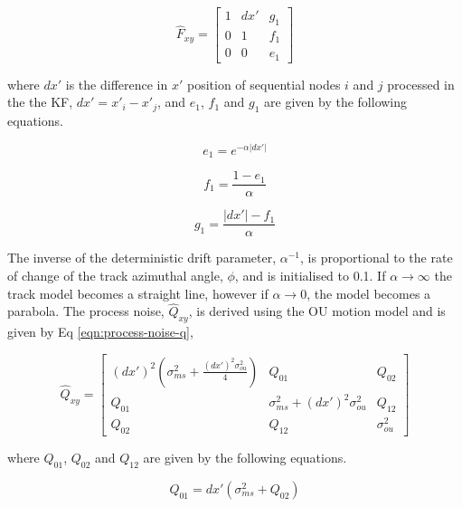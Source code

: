 \begin{equation}
\hat{F}_{xy} = \begin{bmatrix} 1 & dx' & g_1 \\ 0 & 1 & f_1 \\ 0 & 0 & e_1 \end{bmatrix} 
\label{eqn:state-transition-jacobian-ou}
\end{equation}

where $dx'$ is the difference in $x'$ position of sequential nodes $i$ and $j$ processed in the the KF, $dx' = x'_i - x'_j$, and $e_1$, $f_1$ and $g_1$ are given by the following equations. 

\begin{equation}
e_1 = e^{- \alpha \lvert dx' \rvert}
\label{eqn:e1}
\end{equation}

\begin{equation}
f_1 = \frac{1 - e_1}{\alpha}
\label{eqn:f1}
\end{equation}

\begin{equation}
g_1 = \frac{\lvert dx' \rvert - f_1}{\alpha}
\label{eqn:g1}
\end{equation}

The inverse of the deterministic drift parameter, $\alpha^{-1}$, is proportional to the rate of change of the track azimuthal angle, $\phi$, and is initialised to 0.1. If $\alpha \rightarrow \infty$ the track model becomes a straight line, however if $\alpha \rightarrow 0$, the model becomes a parabola. The process noise, $\hat{Q}_{xy}$, is derived using the OU motion model \cite{OU} and is given by Eq \eqref{eqn:process-noise-q}, 
 
\begin{equation}
\hat{Q}_{xy} = \begin{bmatrix} (dx')^{2} (\sigma_{ms}^{2} + \frac{(dx')^{2} \sigma_{ou}^{2}}{4}) & Q_{01} & Q_{02} \\  Q_{01} & \sigma_{ms}^2 + (dx')^{2} \sigma_{ou}^{2} & Q_{12} \\ Q_{02} & Q_{12} & \sigma_{ou}^{2} \end{bmatrix} 
\label{eqn:process-noise-q}
\end{equation}

where $Q_{01}$, $Q_{02}$ and $Q_{12}$ are given by the following equations.

\begin{equation}
Q_{01} = dx'( \sigma_{ms}^2 + Q_{02} )
\label{eqn:q01}
\end{equation}

